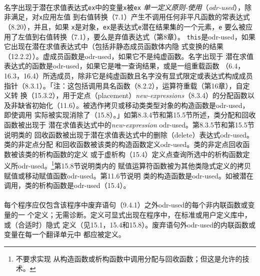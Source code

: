 \paragraph{}
名字出现于潜在求值表达式\texttt{ex}中的变量\texttt{x}被\texttt{ex}
\textit{单一定义原则-使用}（\textit{odr-used}），除非满足，对\texttt{x}应用左值
到右值转换（7.1）产生不调用任何非平凡函数的常表达式（8.20），并且，如果
\texttt{x}是对象，\texttt{ex}是表达式\texttt{e}潜在结果集的一个元素，\texttt{e}
要么被应用了左值到右值转换（7.1），要么是弃值表达式（第8章）。
\texttt{this}是odr-used，如果它出现在潜在求值表达式中（包括非静态成员函数体内隐
式变换的结果（12.2.2））。虚成员函数是odr-used，如果它不是纯虚函数。名字出现于
潜在求值表达式的函数是odr-used，如果它是唯一查询结果，或是一组重载函数
（6.4，16.3，16.4）所选成员，除非它是纯虚函数且名字没有显式限定或表达式构成成员
指针（8.3.1）。「注：这包括调用具名函数（8.2.2），运算符重载（第16章），自定义转
换（15.3.2），用于定点（placement）\textit{new-expressions}（8.3.4）的分配函数以
及非缺省初始化（11.6）。被选作拷贝或移动类类型对象的构造函数是odr-used，即使调用
实际被实现消除了（15.8）。」如第8.3.4节和第15.5节所述，类分配和回收函数被出现于
潜在求值表达式中的\textit{new-expression} odr-used。第8.3.5节和第15.5节说明类的
回收函数被出现于潜在求值表达式中的删除（delete）表达式odr-used。 类的非定点分配
和回收函数被该类的构造函数定义odr-used。类的非定点回收函数被该类的析构函数的定义
或于虚析构（15.4）定义点查询所选中的析构函数定义所odr-used。\footnote{不要求实现
从构造函数或析构函数中调用分配与回收函数；但这是允许的技术。}第15.8节说明类内的
赋值运算符函数被为其他类隐式定义的拷贝赋值或移动赋值函数odr-used。第11.6节说明
类的构造函数是odr-used。如被潜在调用，类的析构函数是odr-used（15.4）。

\paragraph{}
每个程序应仅包含该程序中废弃语句（9.4.1）之外odr-used的每个非内联函数或变量的一
个定义；无需诊断。定义可显式出现在程序中，在标准或用户定义库中，或（合适时）隐式
定义（见15.1，15.4和15.8）。废弃语句外odr-used的内联函数或变量在每一个翻译单元中
都应被定义。

